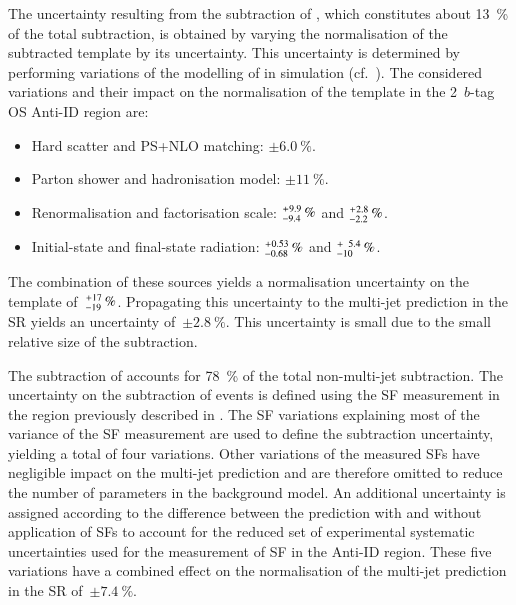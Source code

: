 The uncertainty resulting from the subtraction of \ttbarTrue, which constitutes
about \SI{13}{\percent} of the total subtraction, is obtained by varying the
normalisation of the subtracted \ttbarTrue template by its uncertainty. This
uncertainty is determined by performing variations of the modelling of \ttbar in
simulation (cf.~). The considered variations and
their impact on the normalisation of the \ttbarTrue template in the 2~$b$-tag OS
Anti-ID region are:
\begin{itemize}
\item Hard scatter and PS+NLO matching: $\pm\SI{6.0}{\percent}$.

\item Parton shower and hadronisation model: $\pm\SI{11}{\percent}$.

\item Renormalisation and factorisation scale:
  $^{\hspace{0.25pt}+\hspace{0.25pt}9.9}_{-9.4}\,{\si{\percent}}$ and
  $^{\hspace{0.25pt}+\hspace{0.25pt}2.8}_{-2.2}\,{\si{\percent}}$.

\item Initial-state and final-state radiation:
  $^{\hspace{0.25pt}+\hspace{0.25pt}0.53}_{-0.68}\,{\si{\percent}}$ and
  $^{\hspace{0.25pt}+\hspace{0.25pt}\phantom{1}5.4}_{-10}\,{\si{\percent}}$.
\end{itemize}
The combination of these sources yields a normalisation uncertainty on the
\ttbarTrue template
of~$^{\hspace{0.25pt}+\hspace{0.25pt}17}_{-19}\,{\si{\percent}}$. Propagating
this uncertainty to the multi-jet prediction in the SR yields an uncertainty
of~$\pm \SI{2.8}{\percent}$. This uncertainty is small due to the small relative
size of the \ttbarTrue subtraction.

The subtraction of \ttbarFakes accounts for \SI{78}{\percent} of the total
non-multi-jet subtraction. The uncertainty on the subtraction of \ttbarFake
events is defined using the \ttbarFakes SF measurement in the \antiid region
previously described in . The SF variations
explaining most of the variance of the SF measurement are used to define the
\ttbarFakes subtraction uncertainty, yielding a total of four variations. Other
variations of the measured SFs have negligible impact on the multi-jet
prediction and are therefore omitted to reduce the number of parameters in the
background model. An additional uncertainty is assigned according to the
difference between the \ttbarFakes prediction with and without application of
SFs to account for the reduced set of experimental systematic uncertainties used
for the measurement of \ttbarFakes SF in the Anti-ID region. These five
variations have a combined effect on the normalisation of the multi-jet
prediction in the SR of~$\pm\SI{7.4}{\percent}$.

